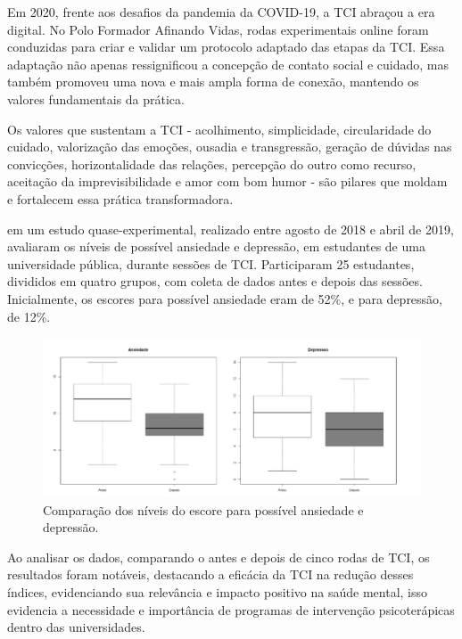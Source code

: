 Em 2020, frente aos desafios da pandemia da COVID-19, a TCI abraçou a era digital. No Polo Formador Afinando Vidas, rodas experimentais online foram conduzidas para criar e validar um protocolo adaptado das etapas da TCI. Essa adaptação não apenas ressignificou a concepção de contato social e cuidado, mas também promoveu uma nova e mais ampla forma de conexão, mantendo os valores fundamentais da prática. \cite{SILVAeOTAVIANO}

Os valores que sustentam a TCI - acolhimento, simplicidade, circularidade do cuidado, valorização das emoções, ousadia e transgressão, geração de dúvidas nas convicções, horizontalidade das relações, percepção do outro como recurso, aceitação da imprevisibilidade e amor com bom humor - são pilares que moldam e fortalecem essa prática transformadora.\cite{SILVA}

 \cite{BOARETTO} em um estudo quase-experimental, realizado entre agosto de 2018 e abril de 2019, avaliaram os níveis de possível ansiedade e depressão, em estudantes de uma universidade pública, durante sessões de TCI. Participaram 25 estudantes, divididos em quatro grupos, com coleta de dados antes e depois das sessões. Inicialmente, os escores para possível ansiedade eram de 52\%, e para depressão, de 12\%.

\begin{figure}[!h] %
    \centering
    \includegraphics[scale=0.5]{latex/figuras/boaretto.pdf}
    \caption[Terapia Comunitária Integrativa]%
    {Comparação dos níveis do escore para possível ansiedade e depressão. \cite{BOARETTO}}%
\end{figure}

Ao analisar os dados, comparando o antes e depois de cinco rodas de TCI, os resultados foram notáveis, destacando a eficácia da TCI na redução desses índices, evidenciando sua relevância e impacto positivo na saúde mental, isso evidencia a necessidade e importância de programas de intervenção psicoterápicas dentro das universidades.\cite{BOARETTO}

